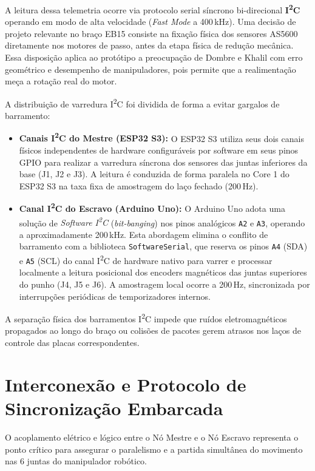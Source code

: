 A leitura dessa telemetria ocorre via protocolo serial síncrono bi-direcional \textbf{I\textsuperscript{2}C} operando em modo de alta velocidade (\textit{Fast Mode} a 400\,kHz). Uma decisão de projeto relevante no braço EB15 consiste na fixação física dos sensores AS5600 diretamente nos motores de passo, antes da etapa física de redução mecânica. Essa disposição aplica ao protótipo a preocupação de Dombre e Khalil com erro geométrico e desempenho de manipuladores, pois permite que a realimentação meça a rotação real do motor.

A distribuição de varredura I\textsuperscript{2}C foi dividida de forma a evitar gargalos de barramento:
\begin{itemize}
    \item \textbf{Canais I\textsuperscript{2}C do Mestre (ESP32 S3):} O ESP32 S3 utiliza seus dois canais físicos independentes de hardware configuráveis por software em seus pinos GPIO para realizar a varredura síncrona dos sensores das juntas inferiores da base (J1, J2 e J3). A leitura é conduzida de forma paralela no Core 1 do ESP32 S3 na taxa fixa de amostragem do laço fechado (200\,Hz).
    \item \textbf{Canal I\textsuperscript{2}C do Escravo (Arduino Uno):} O Arduino Uno adota uma solução de \textit{Software I\textsuperscript{2}C} (\textit{bit-banging}) nos pinos analógicos \texttt{A2} e \texttt{A3}, operando a aproximadamente 200\,kHz. Esta abordagem elimina o conflito de barramento com a biblioteca \texttt{SoftwareSerial}, que reserva os pinos \texttt{A4} (SDA) e \texttt{A5} (SCL) do canal I\textsuperscript{2}C de hardware nativo para varrer e processar localmente a leitura posicional dos encoders magnéticos das juntas superiores do punho (J4, J5 e J6). A amostragem local ocorre a 200\,Hz, sincronizada por interrupções periódicas de temporizadores internos.
\end{itemize}

A separação física dos barramentos I\textsuperscript{2}C impede que ruídos eletromagnéticos propagados ao longo do braço ou colisões de pacotes gerem atrasos nos laços de controle das placas correspondentes.

\section{Interconexão e Protocolo de Sincronização Embarcada}
\label{sec:protocolo_sincronizacao}

O acoplamento elétrico e lógico entre o Nó Mestre e o Nó Escravo representa o ponto crítico para assegurar o paralelismo e a partida simultânea do movimento nas 6 juntas do manipulador robótico.

